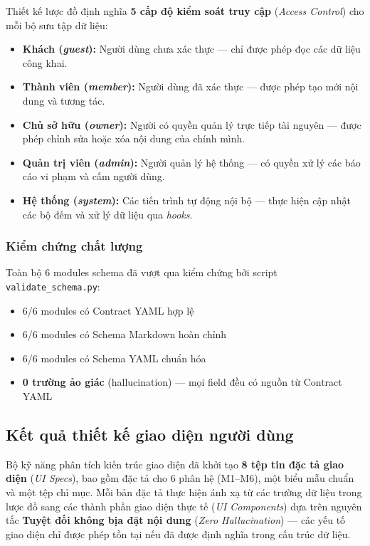 \documentclass[13pt,a4paper,oneside]{extreport}
\numberwithin{equation}{chapter}
\numberwithin{figure}{chapter}
\numberwithin{table}{chapter}
\begin{document}
Thiết kế lược đồ định nghĩa \textbf{5 cấp độ kiểm soát truy cập} (\textit{Access Control}) cho mỗi bộ sưu tập dữ liệu:

\begin{itemize}
    \item \textbf{Khách (\textit{guest}):} Người dùng chưa xác thực — chỉ được phép đọc các dữ liệu công khai.
    \item \textbf{Thành viên (\textit{member}):} Người dùng đã xác thực — được phép tạo mới nội dung và tương tác.
    \item \textbf{Chủ sở hữu (\textit{owner}):} Người có quyền quản lý trực tiếp tài nguyên — được phép chỉnh sửa hoặc xóa nội dung của chính mình.
    \item \textbf{Quản trị viên (\textit{admin}):} Người quản lý hệ thống — có quyền xử lý các báo cáo vi phạm và cấm người dùng.
    \item \textbf{Hệ thống (\textit{system}):} Các tiến trình tự động nội bộ — thực hiện cập nhật các bộ đếm và xử lý dữ liệu qua \textit{hooks}.
\end{itemize}

\subsubsection{Kiểm chứng chất lượng}

Toàn bộ 6 modules schema đã vượt qua kiểm chứng bởi script \texttt{validate\_schema.py}:
\begin{itemize}
    \item 6/6 modules có Contract YAML hợp lệ
    \item 6/6 modules có Schema Markdown hoàn chỉnh
    \item 6/6 modules có Schema YAML chuẩn hóa
    \item \textbf{0 trường ảo giác} (hallucination) — mọi field đều có nguồn từ Contract YAML
\end{itemize}

\subsection{Kết quả thiết kế giao diện người dùng}

Bộ kỹ năng phân tích kiến trúc giao diện đã khởi tạo \textbf{8 tệp tin đặc tả giao diện} (\textit{UI Specs}), bao gồm đặc tả cho 6 phân hệ (M1--M6), một biểu mẫu chuẩn và một tệp chỉ mục. Mỗi bản đặc tả thực hiện ánh xạ từ các trường dữ liệu trong lược đồ sang các thành phần giao diện thực tế (\textit{UI Components}) dựa trên nguyên tắc \textbf{Tuyệt đối không bịa đặt nội dung} (\textit{Zero Hallucination}) — các yếu tố giao diện chỉ được phép tồn tại nếu đã được định nghĩa trong cấu trúc dữ liệu.
\end{document}
